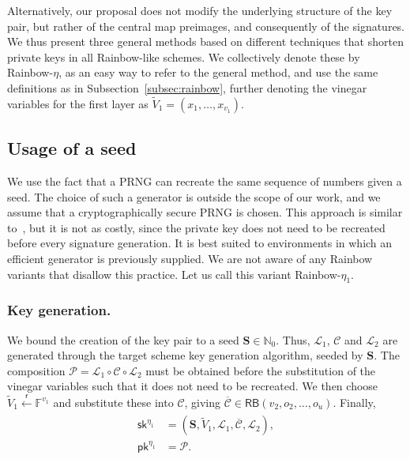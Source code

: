 \documentclass[english]{ufsc-thesis-rn46-2019/ufsc-thesis-rn46-2019}
\newcommand{\random}{\overset{\mathsf{r}}{\gets}}
\theoremstyle{definition}
\begin{document}
Alternatively, our proposal does not modify the underlying structure of the key
pair, but rather of the central map preimages, and consequently of the
signatures. We thus present three general methods based on different techniques
that shorten private keys in all Rainbow-like schemes. We collectively denote
these by Rainbow-$\eta$, as an easy way to refer to the general method, and use
the same definitions as in Subsection~\ref{subsec:rainbow}, further denoting
the vinegar variables for the first layer as
$\widetilde{V}_{1} = (x_{1}, \dots, x_{v_{1}})$.

\subsection{Usage of a seed}

We use the fact that a PRNG can recreate the same sequence of numbers given
a seed. The choice of such a generator is outside the scope of our work, and we
assume that a cryptographically secure PRNG is chosen. This approach is similar
to~\cite{Shim:201512}, but it is not as costly, since the private key does not
need to be recreated before every signature generation. It is best suited to
environments in which an efficient generator is previously supplied. We are not
aware of any Rainbow variants that disallow this practice. Let us call this
variant Rainbow-$\eta_{1}$.

\subsubsection{Key generation.}

We bound the creation of the key pair to a seed
$\mathbf{S} \in \mathbb{N}_{0}$. Thus, $\mathcal{L}_{1}$, $\mathcal{C}$ and
$\mathcal{L}_{2}$ are generated through the target scheme key generation
algorithm, seeded by $\mathbf{S}$. The composition
$\mathcal{P} = \mathcal{L}_{1} \circ \mathcal{C} \circ \mathcal{L}_{2}$ must be
obtained before the substitution of the vinegar variables such that it does not
need to be recreated. We then choose
$\widetilde{V}_{1} \random \mathbb{F}^{v_{1}}$ and substitute these into
$\mathcal{C}$, giving
$\overline{\mathcal{C}} \in \mathsf{RB}(v_{2}, o_{2}, \dots, o_{u})$. Finally,
\begin{align}
  \begin{split}
    \mathsf{sk}^{\eta_{1}}
      &= (\mathbf{S}, \widetilde{V}_{1}, \mathcal{L}_{1},
        \overline{\mathcal{C}}, \mathcal{L}_{2}), \\
    \mathsf{pk}^{\eta_{1}}
      &= \mathcal{P}.
  \end{split}
\end{align}
\end{document}
